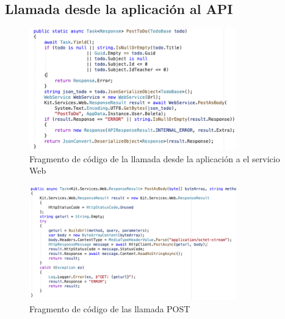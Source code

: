 \documentclass[10pt]{article}
\begin{document}
\subsection{Llamada desde la aplicación al API}
\begin{figure}[H]
    \begin{center}
    \includegraphics[width=0.8\textwidth]{Imagenes/api3.png}
    \caption{Fragmento de código de la llamada desde la aplicación a el servicio Web}
\label{fig1}
    \end{center}
\end{figure} 
\begin{figure}[H]
    \begin{center}
    \includegraphics[width=0.8\textwidth]{Imagenes/api4.png}
     \caption{Fragmento de código de las llamada POST}
\label{fig1}
    \end{center}
\end{figure} 
\end{document}
